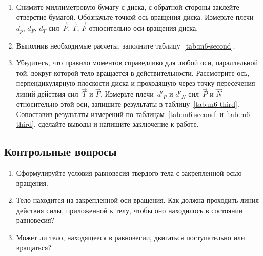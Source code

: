 \documentclass[a4paper, 12pt]{extarticle}
\begin{document}
\begin{enumerate}
\item Снимите миллиметровую бумагу с диска, с обратной стороны заклейте отверстие бумагой. Обозначьте точкой ось вращения диска. Измерьте плечи~$d_p$, $d_F$, $d_T$ сил~$\vec{P}$, $\vec{T}$, $\vec{F}$ относительно оси вращения диска.
\item Выполнив необходимые расчеты, заполните таблицу~\ref{tab:m6-second}.
\item Убедитесь, что правило моментов справедливо для любой оси, параллельной той, вокруг которой тело вращается в действительности. Рассмотрите ось, перпендикулярную плоскости диска и проходящую через точку пересечения линий действия сил~$\vec{T}$ и $\vec{F}$. Измерьте плечи~$d'_P$ и $d'_N$ сил~$\vec{P}$ и $\vec{N}$ относительно этой оси, запишите результаты в таблицу~\ref{tab:m6-third}. Сопоставив результаты измерений по таблицам~\ref{tab:m6-second} и \ref{tab:m6-third}, сделайте выводы и напишите заключение к работе.
\end{enumerate}

\subsection{Контрольные вопросы}
\begin{enumerate}
\item Сформулируйте условия равновесия твердого тела с закрепленной осью вращения. 
\item Тело находится на закрепленной оси вращения. Как должна проходить  линия действия силы, приложенной к телу, чтобы оно находилось в состоянии равновесия?
\item Может ли тело, находящееся в равновесии, двигаться поступательно или вращаться?
\end{enumerate}
\end{document}
